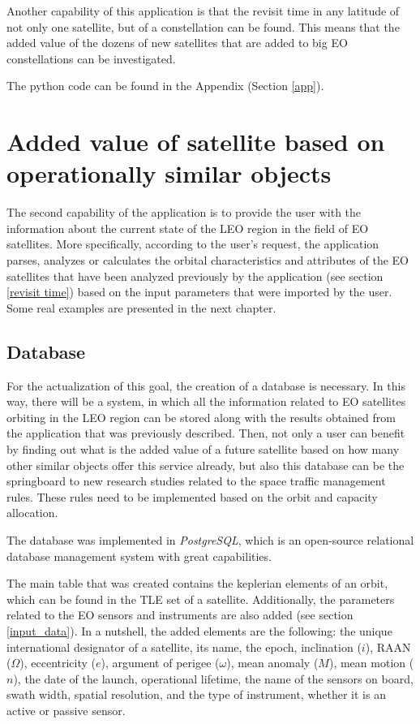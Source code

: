 Another capability of this application is that the revisit time in any latitude of not only one satellite, but of a constellation can be found. This means that the added value of the dozens of new satellites that are added to big EO constellations can be investigated.

\bigskip
The python code can be found in the Appendix (Section \ref{app}).

\bigskip
\section{Added value of satellite based on operationally similar objects}
\label{added value}
\bigskip

The second capability of the application is to provide the user with the information about the current state of the LEO region in the field of EO satellites. More specifically, according to the user's request, the application parses, analyzes or calculates the orbital characteristics and attributes of the EO satellites that have been analyzed previously by the application (see section \ref{revisit time}) based on the input parameters that were imported by the user. Some real examples are presented in the next chapter.

\bigskip
\subsection{Database}
\label{database_ch3}
\bigskip

For the actualization of this goal, the creation of a database is necessary. In this way, there will be a system, in which all the information related to EO satellites orbiting in the LEO region can be stored along with the results obtained from the application that was previously described. Then, not only a user can benefit by finding out what is the added value of a future satellite based on how many other similar objects offer this service already, but also this database can be the springboard to new research studies related to the space traffic management rules. These rules need to be implemented based on the orbit and capacity allocation.

\bigskip
The database was implemented in \textit{PostgreSQL}, which is an open-source relational database management system with great capabilities.  

The main table that was created contains the keplerian elements of an orbit, which can be found in the TLE set of a satellite. Additionally, the parameters related to the EO sensors and instruments are also added (see section \ref{input_data}). In a nutshell, the added elements are the following: the unique international designator of a satellite, its name, the epoch, inclination ($i$), RAAN ($\Omega$), eccentricity ($e$), argument of perigee ($\omega$), mean anomaly ($M$), mean motion ($n$), the date of the launch, operational lifetime, the name of the sensors on board, swath width, spatial resolution, and the type of instrument, whether it is an active or passive sensor.


